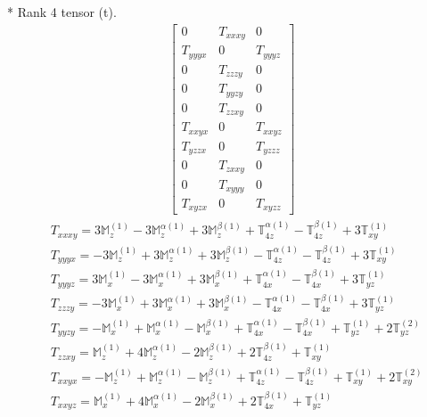 \documentclass[fleqn,8pt,landscape]{jsarticle}
\begin{document}
* Rank 4 tensor (t).
\begin{align*}
\begin{bmatrix} 0 & T_{xxxy} & 0 \\ T_{yyyx} & 0 & T_{yyyz} \\ 0 & T_{zzzy} & 0 \\ 0 & T_{yyzy} & 0 \\ 0 & T_{zzxy} & 0 \\ T_{xxyx} & 0 & T_{xxyz} \\ T_{yzzx} & 0 & T_{yzzz} \\ 0 & T_{zxxy} & 0 \\ 0 & T_{xyyy} & 0 \\ T_{xyzx} & 0 & T_{xyzz} \end{bmatrix}
\end{align*}
\begin{align*}
& T_{xxxy} = 3 \mathbb{M}_{z}^{(1)} - 3 \mathbb{M}_{z}^{\alpha(1)} + 3 \mathbb{M}_{z}^{\beta(1)} + \mathbb{T}_{4z}^{\alpha(1)} - \mathbb{T}_{4z}^{\beta(1)} + 3 \mathbb{T}_{xy}^{(1)} \\
& T_{yyyx} = - 3 \mathbb{M}_{z}^{(1)} + 3 \mathbb{M}_{z}^{\alpha(1)} + 3 \mathbb{M}_{z}^{\beta(1)} - \mathbb{T}_{4z}^{\alpha(1)} - \mathbb{T}_{4z}^{\beta(1)} + 3 \mathbb{T}_{xy}^{(1)} \\
& T_{yyyz} = 3 \mathbb{M}_{x}^{(1)} - 3 \mathbb{M}_{x}^{\alpha(1)} + 3 \mathbb{M}_{x}^{\beta(1)} + \mathbb{T}_{4x}^{\alpha(1)} - \mathbb{T}_{4x}^{\beta(1)} + 3 \mathbb{T}_{yz}^{(1)} \\
& T_{zzzy} = - 3 \mathbb{M}_{x}^{(1)} + 3 \mathbb{M}_{x}^{\alpha(1)} + 3 \mathbb{M}_{x}^{\beta(1)} - \mathbb{T}_{4x}^{\alpha(1)} - \mathbb{T}_{4x}^{\beta(1)} + 3 \mathbb{T}_{yz}^{(1)} \\
& T_{yyzy} = - \mathbb{M}_{x}^{(1)} + \mathbb{M}_{x}^{\alpha(1)} - \mathbb{M}_{x}^{\beta(1)} + \mathbb{T}_{4x}^{\alpha(1)} - \mathbb{T}_{4x}^{\beta(1)} + \mathbb{T}_{yz}^{(1)} + 2 \mathbb{T}_{yz}^{(2)} \\
& T_{zzxy} = \mathbb{M}_{z}^{(1)} + 4 \mathbb{M}_{z}^{\alpha(1)} - 2 \mathbb{M}_{z}^{\beta(1)} + 2 \mathbb{T}_{4z}^{\beta(1)} + \mathbb{T}_{xy}^{(1)} \\
& T_{xxyx} = - \mathbb{M}_{z}^{(1)} + \mathbb{M}_{z}^{\alpha(1)} - \mathbb{M}_{z}^{\beta(1)} + \mathbb{T}_{4z}^{\alpha(1)} - \mathbb{T}_{4z}^{\beta(1)} + \mathbb{T}_{xy}^{(1)} + 2 \mathbb{T}_{xy}^{(2)} \\
& T_{xxyz} = \mathbb{M}_{x}^{(1)} + 4 \mathbb{M}_{x}^{\alpha(1)} - 2 \mathbb{M}_{x}^{\beta(1)} + 2 \mathbb{T}_{4x}^{\beta(1)} + \mathbb{T}_{yz}^{(1)} \\

\end{align*}
\end{document}

